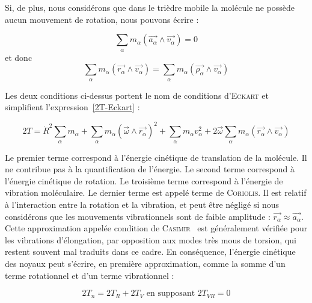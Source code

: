 Si, de plus, nous considérons que dans le trièdre mobile la molécule ne possède aucun mouvement de rotation, nous pouvons écrire :

\begin{equation}
	\sum_{\alpha}m_{\alpha}\left(\stackrel{\rightarrow}{a_{\alpha}} \wedge \stackrel{\rightarrow}{v_{\alpha}}\right) = 0
\end{equation}
\noindent et donc
\begin{equation}
	\sum_{\alpha}m_{\alpha}\left(\stackrel{\rightarrow}{r_{\alpha}} \wedge \stackrel{\rightarrow}{v_{\alpha}}\right) = \sum_{\alpha}m_{\alpha}\left(\stackrel{\rightarrow}{\rho_{\alpha}} \wedge \stackrel{\rightarrow}{v_{\alpha}}\right)
\end{equation}

Les deux conditions ci-dessus portent le nom de conditions d'\textsc{Eckart} et simplifient l'expression~\ref{2T-Eckart} :
	
\begin{equation}
	2T = \dot{R}^2\sum_{\alpha}m_{\alpha} + \sum_{\alpha}m_{\alpha}\left(\stackrel{\rightarrow}{\omega} \wedge \stackrel{\rightarrow}{r_{\alpha}}\right)^2 + \sum_{\alpha}m_{\alpha}v^2_{\alpha} + 2\stackrel{\rightarrow}{\omega}\sum_{\alpha}m_{\alpha}\left(\stackrel{\rightarrow}{r_{\alpha}} \wedge \stackrel{\rightarrow}{v_{\alpha}}\right)
\end{equation}

Le premier terme correspond à l'énergie cinétique de translation de la molécule. Il ne contribue pas à la quantification de l'énergie. Le second terme correspond  à l'énergie cinétique de rotation. Le troisième terme correspond à l'énergie de vibration moléculaire. Le dernier terme est appelé terme de \textsc{Coriolis}. Il est relatif à l'interaction entre la rotation et la vibration, et peut être négligé si nous considérons que les mouvements vibrationnels sont de faible amplitude : $\stackrel{\rightarrow}{r_{\alpha}} \approx \stackrel{\rightarrow}{a_{\alpha}}$. Cette approximation  appelée condition de \textsc{Casimir}~\cite{II-11} est généralement vérifiée pour les vibrations d'élongation, par opposition aux modes très mous de torsion, qui restent souvent mal traduits dans ce cadre.
En conséquence, l'énergie cinétique des noyaux peut s'écrire, en première approximation, comme la somme d'un terme rotationnel et d'un terme vibrationnel :

\begin{equation}
	2T_n = 2T_R + 2 T_V \text{ en supposant }2T_{VR} = 0
\end{equation}

